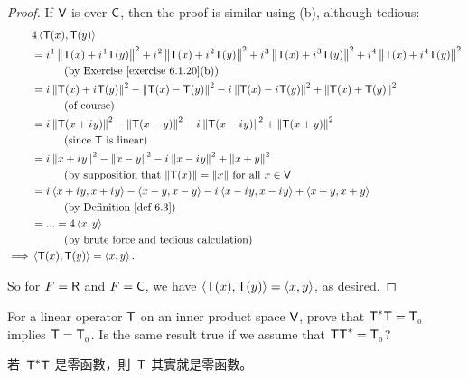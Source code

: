 \begin{proof}
If \(\textsf{V}\) is over \(\textsf{C}\), then the proof is similar using (b), although tedious:
\begin{align*}
    & 4 \LG \T(x), \T(y) \RG \\
    & = \iu^1 \norm{\T(x) + \iu^1 \T(y)}^2 + \iu^2 \norm{\T(x) + \iu^2 \T(y)}^2
        + \iu^3 \norm{\T(x) + \iu^3 \T(y)}^2 + \iu^4 \norm{\T(x) + \iu^4 \T(y)}^2 \\
        & \text{\quad \quad \quad (by \EXEC{6.1.20}(b))} \\
    & = \iu \norm{\T(x) + \iu \T(y)}^2
        - \norm{\T(x) - \T(y)}^2
        - \iu\norm{\T(x) - \iu \T(y)}^2 + \norm{\T(x) + \T(y)}^2 \\
        & \text{\quad \quad \quad (of course)} \\
    & = \iu \norm{\T(x + \iu y)}^2
        - \norm{\T(x - y)}^2
        - \iu\norm{\T(x - \iu y)}^2 + \norm{\T(x + y)}^2 \\
        & \text{\quad \quad \quad (since \(\T\) is linear)} \\
    & = \iu \norm{x + \iu y}^2
        - \norm{x - y}^2
        - \iu\norm{x - \iu y}^2 + \norm{x + y}^2 \\
        & \text{\quad \quad \quad (by supposition that \(\norm{\T(x)} = \norm{x}\) for all \(x \in \V\)} \\
    & = \iu \LG x + \iu y, x + \iu y \RG
        - \LG x - y, x - y \RG
        - \iu \LG x - \iu y, x - \iu y \RG + \LG x + y, x + y \RG \\
        & \text{\quad \quad \quad (by \DEF{6.3})} \\
    & = ... = 4 \LG x, y \RG \\
    & \text{\quad \quad \quad (by brute force and tedious calculation)} \\
    \implies & \LG \T(x), \T(y) \RG = \LG x, y \RG.
\end{align*}

So for \(F = \textsf{R}\) and \(F = \textsf{C}\), we have \(\left< \textsf{T}(x), \textsf{T}(y) \right> = \left< x, y \right>\), as desired.
\end{proof}

\begin{exercise} \label{exercise 6.3.11}
For a linear operator \(\textsf{T}\) on an inner product space \(\textsf{V}\), prove that \(\textsf{T}^*\textsf{T} = \textsf{T}_{_0}\) implies \(\textsf{T} = \textsf{T}_{_0}\).
Is the same result true if we assume that \(\textsf{T}\textsf{T}^* = \textsf{T}_{_0}\)?
\end{exercise}

\begin{note}
若\ \(\textsf{T}^*\textsf{T}\) 是零函數，則\ \(\textsf{T}\) 其實就是零函數。
\end{note}


